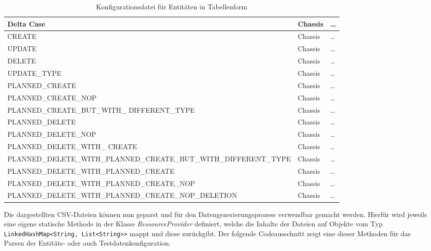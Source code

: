 \begin{table}[h]
\begin{center}
    \scriptsize
    \begin{tabular}{| p{42em} | m{3em} | m{1em} |}
        \hline
         Delta Case & Chassis & \ldots \\ 
         \hline\hline
         CREATE & Chassis & \ldots \\ 
         \hline
         UPDATE & Chassis & \ldots \\  
         \hline
         DELETE & Chassis & \ldots \\ 
         \hline
         UPDATE\_TYPE & Chassis & \ldots \\ 
         \hline
         PLANNED\_CREATE & Chassis & \ldots \\ 
         \hline
         PLANNED\_CREATE\_NOP & Chassis & \ldots \\ 
         \hline
         PLANNED\_CREATE\_BUT\_WITH\_ DIFFERENT\_TYPE & Chassis & \ldots \\ 
         \hline
         PLANNED\_DELETE & Chassis & \ldots \\ 
         \hline
         PLANNED\_DELETE\_NOP & Chassis & \ldots \\ 
         \hline
         PLANNED\_DELETE\_WITH\_ CREATE & Chassis & \ldots \\ 
         \hline
         PLANNED\_DELETE\_WITH\_PLANNED\_CREATE\_BUT\_WITH\_DIFFERENT\_TYPE & Chassis & \ldots \\ 
         \hline
         PLANNED\_DELETE\_WITH\_PLANNED\_CREATE & Chassis & \ldots \\ 
         \hline
         PLANNED\_DELETE\_WITH\_PLANNED\_CREATE\_NOP & Chassis & \ldots \\ 
         \hline
         PLANNED\_DELETE\_WITH\_PLANNED\_CREATE\_NOP\_DELETION & Chassis & \ldots \\ 
        \hline
    \end{tabular}
    \caption{Konfigurationsdatei für Entitäten in Tabellenform}\label{tab:entityConfig}
\end{center}
\end{table}

Die dargestellten \ac{CSV}-Dateien können nun geparst und für den Datengenerierungsprozess verwendbar gemacht werden. Hierfür wird jeweils eine eigene statische Methode in der Klasse \textit{RessourceProvider} definiert, welche die Inhalte der Dateien auf Objekte vom Typ \colorbox{background}{\lstinline{LinkedHashMap<String, List<String>>}} mappt und diese zurückgibt. Der folgende Codeausschnitt zeigt eine dieser Methoden für das Parsen der Entitäts- oder auch Testdatenkonfiguration. 

